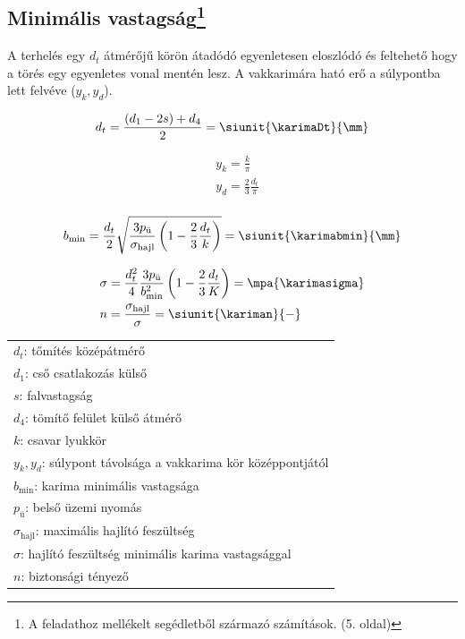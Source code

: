 \newpage
\subsection[Minimális vastagság]{Minimális vastagság\protect\footnote{A feladathoz mellékelt segédletből származó számítások. (5. oldal)}}

A terhelés egy $d_t$ átmérőjű körön átadódó egyenletesen eloszlódó és feltehető hogy a törés egy egyenletes vonal mentén lesz. A vakkarimára ható erő a súlypontba lett felvéve ($y_k, y_d$).

\begin{equation}
	d_t = \frac{(d_1 - 2s) + d_4}{2} = \siunit{\karimaDt}{\mm}
\end{equation}

\begin{align}
	&y_k = \frac{k}{\pi} \\
	&y_d = \frac{2}{3} \frac{d_t}{\pi} \\
\end{align}

\begin{equation}
	b_{\text{min}} 
	= \frac{d_t}{2} \sqrt{\frac{3p_\text{ü}}{\sigma_{\text{hajl}}} \left(1-\frac{2}{3} \frac{d_t}{k}\right)} 
	= \siunit{\karimabmin}{\mm}
\end{equation}

\begin{align}
	&\sigma = 
	\frac{d_{t}^2}{4} 
	\frac{3p_{\text{ü}}}{b_{\text{min}}^2}
	\left(1-\frac{2}{3}\frac{d_t}{K}\right) = \mpa{\karimasigma} \\
	&n = \frac{\sigma_{\text{hajl}}}{\sigma} = \siunit{\kariman}{-}
\end{align}

\begin{center}
	\begin{tabular}{l}
		$d_t$: tőmítés középátmérő \siunit{}{\mm} \\
		$d_1$: cső csatlakozás külső \siunit{}{\mm} \\
		$s$: falvastagság \siunit{}{\mm} \\
		$d_4$: tömítő felület külső átmérő \siunit{}{\mm} \\
		$k$: csavar lyukkör \siunit{}{\mm} \\
		$y_k, y_d$: súlypont távolsága a vakkarima kör középpontjától \siunit{}{\mm} \\
		$b_\text{min}$: karima minimális vastagsága \siunit{}{\mm} \\
		$p_\text{ü}$: belső üzemi nyomás \siunit{}{\mm} \\
		$\sigma_\text{hajl}$: maximális hajlító feszültség \siunit{}{\mega\pascal} \\
		$\sigma$: hajlító feszültség minimális karima vastagsággal \siunit{}{\mega\pascal} \\
		$n$: biztonsági tényező \siunit{}{-} \\
	\end{tabular}
\end{center}
